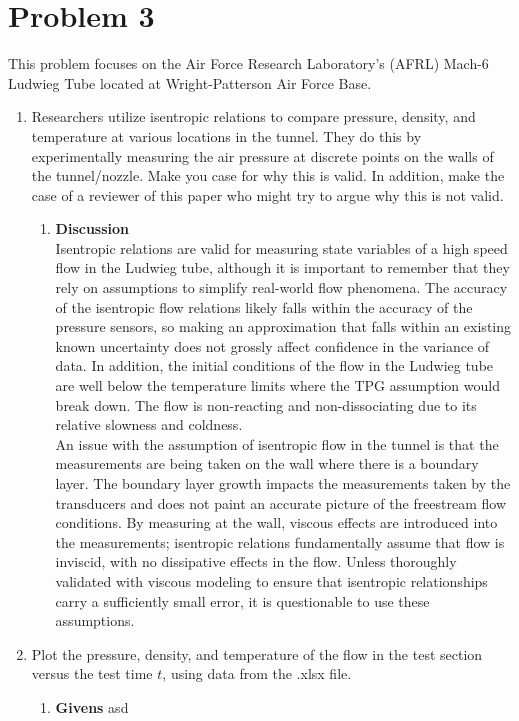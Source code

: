 \documentclass[12pt,letterpaper]{article}
\begin{document}
	\section*{Problem 3}
	This problem focuses on the Air Force Research Laboratory's (AFRL) Mach-6 Ludwieg Tube located at Wright-Patterson Air Force Base. 
	\begin{enumerate}[label=(\alph*)]
		\item Researchers utilize isentropic relations to compare pressure, density, and temperature at various locations in the tunnel. They do this by experimentally measuring the air pressure at discrete points on the walls of the tunnel/nozzle. Make you case for why this is valid. In addition, make the case of a reviewer of this paper who might try to argue why this is not valid.
		\begin{enumerate}[label=\arabic*.]
			\item{\textbf{Discussion}} \\
			Isentropic relations are valid for measuring state variables of a high speed flow in the Ludwieg tube, although it is important to remember that they rely on assumptions to simplify real-world flow phenomena. The accuracy of the isentropic flow relations likely falls within the accuracy of the pressure sensors, so making an approximation that falls within an existing known uncertainty does not grossly affect confidence in the variance of data. In addition, the initial conditions of the flow in the Ludwieg tube are well below the temperature limits where the TPG assumption would break down. The flow is non-reacting and non-dissociating due to its relative slowness and coldness. 
			\\
			An issue with the assumption of isentropic flow in the tunnel is that the measurements are being taken on the wall where there is a boundary layer. The boundary layer growth impacts the measurements taken by the transducers and does not paint an accurate picture of the freestream flow conditions. By measuring at the wall, viscous effects are introduced into the measurements; isentropic relations fundamentally assume that flow is inviscid, with no dissipative effects in the flow. Unless thoroughly validated with viscous modeling to ensure that isentropic relationships carry a sufficiently small error, it is questionable to use these assumptions.%
		\end{enumerate}
		\item Plot the pressure, density, and temperature of the flow in the test section versus the test time $t$, using data from the .xlsx file.
		\begin{enumerate}[label=\arabic*.]
			\item{\textbf{Givens}}
			asd
			

\end{enumerate}
\end{enumerate}
\end{document}
